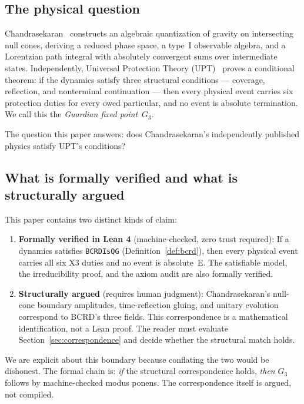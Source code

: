 \documentclass[11pt,a4paper]{article}
\theoremstyle{definition}
\theoremstyle{remark}
\begin{document}
\subsection{The physical question}

Chandrasekaran~\cite{chandrasekaran2026} constructs an algebraic quantization of gravity on intersecting null cones, deriving a reduced phase space, a type~I observable algebra, and a Lorentzian path integral with absolutely convergent sums over intermediate states. Independently, Universal Protection Theory (UPT)~\cite{upt-zenodo} proves a conditional theorem: if the dynamics satisfy three structural conditions --- coverage, reflection, and nonterminal continuation --- then every physical event carries six protection duties for every owed particular, and no event is absolute termination. We call this the \emph{Guardian fixed point}~$G_3$.

The question this paper answers: does Chandrasekaran's independently published physics satisfy UPT's conditions?

\subsection{What is formally verified and what is structurally argued}

This paper contains two distinct kinds of claim:

\begin{enumerate}
\item \textbf{Formally verified in Lean 4} (machine-checked, zero trust required): If a dynamics satisfies \texttt{BCRDIsQG} (Definition~\ref{def:bcrd}), then every physical event carries all six X3 duties and no event is absolute~E. The satisfiable model, the irreducibility proof, and the axiom audit are also formally verified.
\item \textbf{Structurally argued} (requires human judgment): Chandrasekaran's null-cone boundary amplitudes, time-reflection gluing, and unitary evolution correspond to BCRD's three fields. This correspondence is a mathematical identification, not a Lean proof. The reader must evaluate Section~\ref{sec:correspondence} and decide whether the structural match holds.
\end{enumerate}

We are explicit about this boundary because conflating the two would be dishonest. The formal chain is: \emph{if} the structural correspondence holds, \emph{then} $G_3$ follows by machine-checked modus ponens. The correspondence itself is argued, not compiled.
\end{document}
